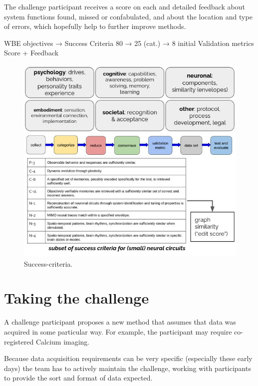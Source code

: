 \documentclass{ldr-article}
\begin{document}
The challenge participant receives a score on each and detailed feedback about system functions found, missed or confabulated, and about the location and type of errors, which hopefully help to further improve methods.

WBE objectives → Success Criteria
80 → 25 (cat.) → 8 initial
Validation metrics
Score + Feedback

\begin{figure}
	\centering
	\includegraphics[width=1\linewidth]{figures/success-criteria.jpg}
	\caption{Success-criteria.}
	\label{fig:success-criteria}
\end{figure}



\section{Taking the challenge}

A challenge participant proposes a new method that assumes that data was acquired in some particular way. For example, the participant may require co-registered Calcium imaging.

Because data acquisition requirements can be very specific (especially these early days) the team has to actively maintain the challenge, working with participants to provide the sort and format of data expected.
\end{document}
